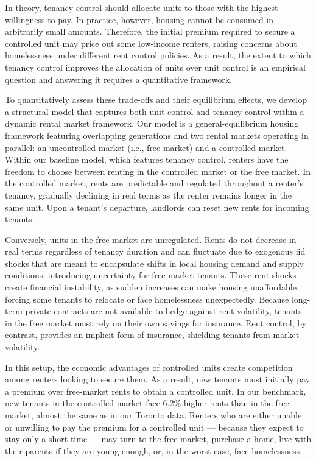 \documentclass[parskip=full]{article}
\begin{document}
In theory, tenancy control should allocate units to those with the highest willingness to pay. In practice, however, housing cannot be consumed in arbitrarily small amounts. Therefore, the initial premium required to secure a controlled unit may price out some low-income renters, raising concerns about homelessness under different rent control policies. As a result, the extent to which tenancy control improves the allocation of units over unit control is an empirical question and answering it requires a quantitative framework.

To quantitatively assess these trade-offs and their equilibrium effects, we develop a structural model that captures both unit control and tenancy control within a dynamic rental market framework. Our model is a general-equilibrium housing framework featuring overlapping generations and two rental markets operating in parallel: an uncontrolled market (i.e., free market) and a controlled market. Within our baseline model, which features tenancy control, renters have the freedom to choose between renting in the controlled market or the free market. In the controlled market, rents are predictable and regulated throughout a renter's tenancy, gradually declining in real terms as the renter remains longer in the same unit. Upon a tenant's departure, landlords can reset new rents for incoming tenants. 

Conversely, units in the free market are unregulated. Rents do not decrease in real terms regardless of tenancy duration and can fluctuate due to exogenous iid shocks that are meant to encapsulate shifts in local housing demand and supply conditions, introducing uncertainty for free-market tenants. These rent shocks create financial instability, as sudden increases can make housing unaffordable, forcing some tenants to relocate or face homelessness unexpectedly. Because long-term private contracts are not available to hedge against rent volatility, tenants in the free market must rely on their own savings for insurance. Rent control, by contrast, provides an implicit form of insurance, shielding tenants from market volatility.

In this setup, the economic advantages of controlled units create competition among renters looking to secure them. As a result, new tenants must initially pay a premium over free-market rents to obtain a controlled unit. In our benchmark, new tenants in the controlled market face 6.2\% higher rents than in the free market, almost the same as in our Toronto data. Renters who are either unable or unwilling to pay the premium for a controlled unit — because they expect to stay only a short time — may turn to the free market, purchase a home, live with their parents if they are young enough, or, in the worst case, face homelessness.
\end{document}
